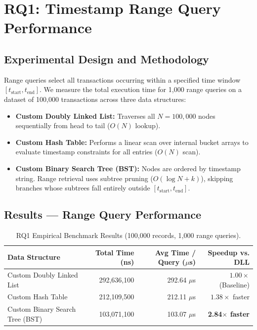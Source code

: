 \documentclass[11pt]{article}
\begin{document}
\section{RQ1: Timestamp Range Query Performance}

\subsection{Experimental Design and Methodology}
Range queries select all transactions occurring within a specified time window $[t_{\text{start}}, t_{\text{end}}]$. We measure the total execution time for 1,000 range queries on a dataset of 100,000 transactions across three data structures:
\begin{itemize}[leftmargin=1.5em]
    \item \textbf{Custom Doubly Linked List:} Traverses all $N=100,000$ nodes sequentially from head to tail ($O(N)$ lookup).
    \item \textbf{Custom Hash Table:} Performs a linear scan over internal bucket arrays to evaluate timestamp constraints for all entries ($O(N)$ scan).
    \item \textbf{Custom Binary Search Tree (BST):} Nodes are ordered by timestamp string. Range retrieval uses subtree pruning ($O(\log N + k)$), skipping branches whose subtrees fall entirely outside $[t_{\text{start}}, t_{\text{end}}]$.
\end{itemize}

\subsection{Results --- Range Query Performance}

\begin{table}[htbp]
\centering
\small
\begin{tabular}{lrrr}
\toprule
\textbf{Data Structure} & \textbf{Total Time (ns)} & \textbf{Avg Time / Query ($\mu$s)} & \textbf{Speedup vs. DLL} \\
\midrule
Custom Doubly Linked List & 292,636,100 & 292.64 $\mu$s & $1.00\times$ (Baseline) \\
Custom Hash Table & 212,109,500 & 212.11 $\mu$s & $1.38\times$ faster \\
Custom Binary Search Tree (BST) & 103,071,100 & 103.07 $\mu$s & \textbf{2.84$\times$ faster} \\
\bottomrule
\end{tabular}
\caption{RQ1 Empirical Benchmark Results (100,000 records, 1,000 range queries).}
\label{tab:rq1}
\end{table}
\end{document}
